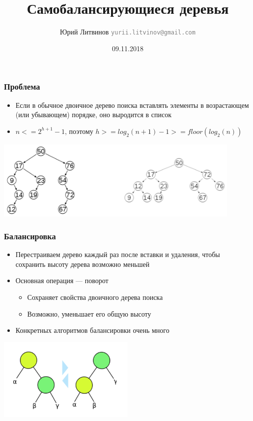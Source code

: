 \documentclass[xetex,mathserif,serif]{beamer}
\title{Самобалансирующиеся деревья}
\author[Юрий Литвинов]{Юрий Литвинов \newline \textcolor{gray}{\small\texttt{yurii.litvinov@gmail.com}}}
\date{09.11.2018}
\begin{document}
	
	\frame{\titlepage}
	
	\begin{frame}
		\frametitle{Проблема}
		\begin{itemize}
			\item Если в обычное двоичное дерево поиска вставлять элементы в возрастающем (или убывающем) порядке, оно выродится в список
			\item $n <= 2^{h + 1} - 1$, поэтому $h >= log_2(n + 1) - 1 >= floor(log_2(n))$
		\end{itemize}
		\begin{center}
			\includegraphics[width=0.9\textwidth]{tree-problem.png}
		\end{center}
	\end{frame}

	\begin{frame}
		\frametitle{Балансировка}
		\begin{itemize}
			\item Перестраиваем дерево каждый раз после вставки и удаления, чтобы сохранить высоту дерева возможно меньшей
			\item Основная операция --- поворот
			\begin{itemize}
				\item Сохраняет свойства двоичного дерева поиска
				\item Возможно, уменьшает его общую высоту
			\end{itemize}
			\item Конкретных алгоритмов балансировки очень много
		\end{itemize}
		\begin{center}
			\includegraphics[width=0.5\textwidth]{balancing.png}
		\end{center}
	\end{frame}
\end{document}
